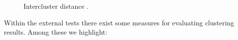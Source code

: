 \begin{figure}[htbp]
  \centering
    \caption{Intercluster distance \citep{b60}.}%
    \label{fig:separation}%
\end{figure}
Within the external tests there exist some measures for evaluating clustering results. Among these we highlight:
